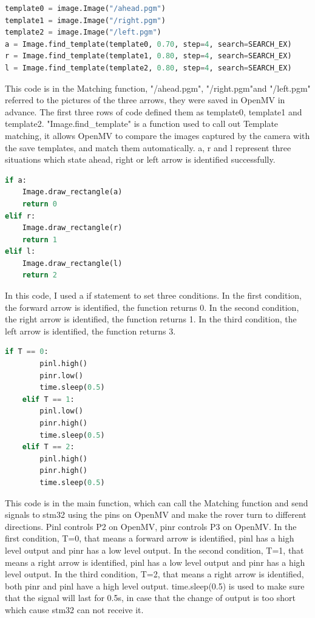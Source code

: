 \documentclass[12pt, a4paper, oneside]{report}
\begin{document}
\begin{lstlisting}[language=Python]
template0 = image.Image("/ahead.pgm")
template1 = image.Image("/right.pgm")
template2 = image.Image("/left.pgm")
a = Image.find_template(template0, 0.70, step=4, search=SEARCH_EX)
r = Image.find_template(template1, 0.80, step=4, search=SEARCH_EX)
l = Image.find_template(template2, 0.80, step=4, search=SEARCH_EX)
\end{lstlisting}
This code is in the Matching function, "/ahead.pgm", "/right.pgm"and "/left.pgm" referred to the pictures of the three arrows, they were saved in OpenMV in advance. The first three rows of code defined them as template0, template1 and template2. "Image.find\_template" is a function used to call out Template matching, it allows OpenMV to compare the images captured by the camera with the  save templates, and match them automatically. a, r and l represent three situations which state ahead, right or left arrow is identified successfully.
\begin{lstlisting}[language=Python]
if a:
    Image.draw_rectangle(a)
    return 0
elif r:
    Image.draw_rectangle(r)
    return 1
elif l:
    Image.draw_rectangle(l)
    return 2
\end{lstlisting}
In this code, I used a if statement to set three conditions. In the first condition, the forward arrow is identified, the function returns 0. In the second condition, the right arrow is identified, the function returns 1. In the third condition, the left arrow is identified, the function returns 3.
\begin{lstlisting}[language=Python]
    if T == 0:
        pinl.high()
        pinr.low()
        time.sleep(0.5)
    elif T == 1:
        pinl.low()
        pinr.high()
        time.sleep(0.5)
    elif T == 2:
        pinl.high()
        pinr.high()
        time.sleep(0.5)
\end{lstlisting}
This code is in the main function, which can call the Matching function and send signals to stm32 using the pins on OpenMV and make the rover turn to different directions. Pinl controls P2 on OpenMV, pinr controls P3 on OpenMV. In the first condition, T=0, that means a forward arrow is identified, pinl has a high level output and pinr has a low level output. In the second condition, T=1, that means a right arrow is identified, pinl has a low level output and pinr has a high level output. In the third condition, T=2, that means a right arrow is identified, both pinr and pinl have a high level output. time.sleep(0.5) is used to make sure that the signal will last for 0.5s, in case that the change of output is too short which cause stm32 can not receive it.
\end{document}
